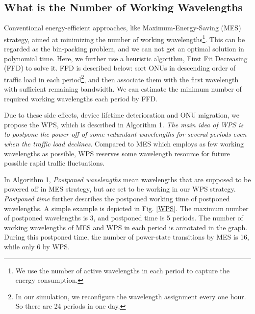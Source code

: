 \documentclass[letter]{IEEEtran}
\begin{document}
\subsection{What is the Number of Working Wavelengths}
Conventional energy-efficient approaches, like Maximum-Energy-Saving (MES) strategy, aimed at minimizing the number of working wavelengths\footnote{We use the number of active wavelengths in each period to capture the energy consumption.}. This can be regarded as the bin-packing problem, and we can not get an optimal solution in polynomial time. Here, we further use a heuristic algorithm, First Fit Decreasing (FFD) \cite{baker1985new} to solve it. FFD is described below: sort ONUs in descending order of traffic load in each period\footnote{In our simulation, we reconfigure the wavelength assignment every one hour. So there are 24 periods in one day.}, and then associate them with the first wavelength with sufficient remaining bandwidth. We can estimate the minimum number of required working wavelengths each period by FFD.

Due to these side effects, device lifetime deterioration and ONU migration, we propose the WPS, which is described in Algorithm 1. \emph{The main idea of WPS is to postpone the power-off of some redundant wavelengths for several periods even when the traffic load declines}. Compared to MES which employs as few working wavelengths as possible, WPS reserves some wavelength resource for future possible rapid traffic fluctuations. 

In Algorithm 1, \emph{Postponed wavelengths} mean wavelengths that are supposed to be powered off in MES strategy, but are set to be working in our WPS strategy. \emph{Postponed time} further describes the postponed working time of postponed wavelengths. A simple example is depicted in Fig. \ref{WPS}. The maximum number of postponed wavelengths is 3, and postponed time is 5 periods. The number of working wavelengths of MES and WPS in each period is annotated in the graph. During this postponed time, the number of power-state transitions by MES is 16, while only 6 by WPS. 
\end{document}
